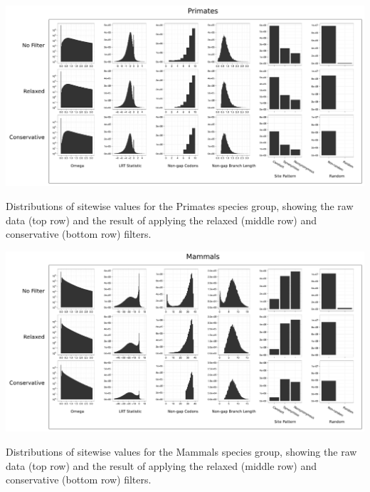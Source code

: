 \bbfig
\centering
\includegraphics[scale=0.42]{Figs/qc_hist_primates.pdf}
\caption{Distributions of sitewise values for the Primates species
  group, showing the raw data (top row) and the result of applying the
  relaxed (middle row) and conservative (bottom row) filters.}
\label{fig_qc_hist_primates}
\eefig

\bbfig
\centering
\includegraphics[scale=0.42]{Figs/qc_hist_mammals.pdf}
\caption{Distributions of sitewise values for the Mammals species
  group, showing the raw data (top row) and the result of applying the
  relaxed (middle row) and conservative (bottom row) filters.}
\label{fig_qc_hist_mammals}
\eefig
 

